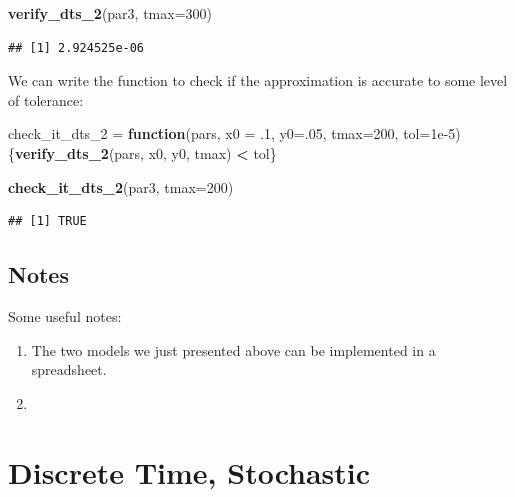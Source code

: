 \documentclass[
]{book}
\newenvironment{Shaded}{\begin{snugshade}}{\end{snugshade}}
\newcommand{\AttributeTok}[1]{\textcolor[rgb]{0.13,0.29,0.53}{#1}}
\newcommand{\ControlFlowTok}[1]{\textcolor[rgb]{0.13,0.29,0.53}{\textbf{#1}}}
\newcommand{\DecValTok}[1]{\textcolor[rgb]{0.00,0.00,0.81}{#1}}
\newcommand{\FloatTok}[1]{\textcolor[rgb]{0.00,0.00,0.81}{#1}}
\newcommand{\FunctionTok}[1]{\textcolor[rgb]{0.13,0.29,0.53}{\textbf{#1}}}
\newcommand{\NormalTok}[1]{#1}
\newcommand{\OtherTok}[1]{\textcolor[rgb]{0.56,0.35,0.01}{#1}}
\newcommand{\SpecialCharTok}[1]{\textcolor[rgb]{0.81,0.36,0.00}{\textbf{#1}}}
\begin{document}
\begin{Shaded}
\begin{Highlighting}[]
\FunctionTok{verify\_dts\_2}\NormalTok{(par3, }\AttributeTok{tmax=}\DecValTok{300}\NormalTok{)}
\end{Highlighting}
\end{Shaded}

\begin{verbatim}
## [1] 2.924525e-06
\end{verbatim}

We can write the function to check if the approximation is accurate to some level of tolerance:

\begin{Shaded}
\begin{Highlighting}[]
\NormalTok{check\_it\_dts\_2 }\OtherTok{=} \ControlFlowTok{function}\NormalTok{(pars, }\AttributeTok{x0 =}\NormalTok{ .}\DecValTok{1}\NormalTok{, }\AttributeTok{y0=}\NormalTok{.}\DecValTok{05}\NormalTok{, }\AttributeTok{tmax=}\DecValTok{200}\NormalTok{, }\AttributeTok{tol=}\FloatTok{1e{-}5}\NormalTok{)}
\NormalTok{\{}\FunctionTok{verify\_dts\_2}\NormalTok{(pars, x0, y0, tmax) }\SpecialCharTok{\textless{}}\NormalTok{ tol\}}
\end{Highlighting}
\end{Shaded}

\begin{Shaded}
\begin{Highlighting}[]
\FunctionTok{check\_it\_dts\_2}\NormalTok{(par3, }\AttributeTok{tmax=}\DecValTok{200}\NormalTok{)}
\end{Highlighting}
\end{Shaded}

\begin{verbatim}
## [1] TRUE
\end{verbatim}

\subsection{Notes}\label{notes}

Some useful notes:

\begin{enumerate}
\def\labelenumi{\arabic{enumi}.}
\item
  The two models we just presented above can be implemented in a spreadsheet.
\item
\end{enumerate}

\section{Discrete Time, Stochastic}\label{discrete-time-stochastic}
\end{document}
